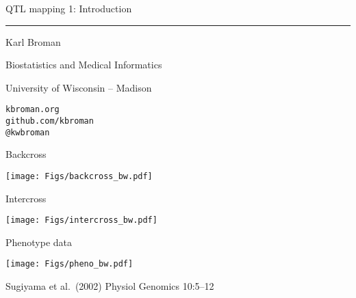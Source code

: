 \documentclass[12pt]{article}
\newcommand{\titlesize}{\fontsize{40}{50} \selectfont}
\newcommand{\headsize}{\fontsize{35}{35} \selectfont}
\newcommand{\textsize}{\fontsize{30}{35} \selectfont}
\newcommand{\smallsize}{\fontsize{25}{30} \selectfont}
\newcommand{\smallestsize}{\fontsize{18}{22} \selectfont}
\begin{document}
\thispagestyle{empty}

\begin{center}
\titlesize \color{myyellow}


\vspace*{15mm}

QTL mapping 1: Introduction

\color{mypink}
\rule{10in}{1mm}

\vspace{5mm}

\textsize \color{myblue}
Karl Broman
\vspace{5mm}

\color{mywhite}
{\smallsize Biostatistics and Medical Informatics

University of Wisconsin -- Madison
\vspace{20mm}


{\tt kbroman.org} \\[3pt]
{\tt github.com/kbroman} \\
{\tt @kwbroman}
}

\end{center}

\newpage
\addtocounter{page}{+2}

\headsize \color{myyellow}
\hfill \begin{minipage}{5.75in}
\centering
Backcross
\end{minipage}

\vfill

\centerline{\texttt{[image: Figs/backcross\_bw.pdf]}}

\newpage

\headsize \color{myyellow}
\hfill \begin{minipage}{5.75in}
\centering
Intercross
\end{minipage}

\vfill

\centerline{\texttt{[image: Figs/intercross\_bw.pdf]}}

\newpage

\headsize \color{myyellow}
\hfill \begin{minipage}{5.75in}
\centering
Phenotype data
\end{minipage}

\vspace{3cm}

\centerline{\texttt{[image: Figs/pheno\_bw.pdf]}}

\vfill
\smallestsize
\color{myblue}
Sugiyama et al.\ (2002) Physiol Genomics 10:5--12
\end{document}
